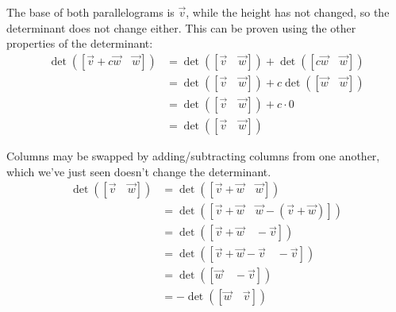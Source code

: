 \begin{applicationActivities}
\begin{observation}
\begin{center}
\end{center}

The base of both parallelograms is $\vec{v}$, while the height has not changed,
so the determinant does not change either. This can be proven using the
other properties of the determinant:
  \begin{align*}
  \det([\vec{v}+c\vec{w}\hspace{1em}\vec{w}])
&=
  \det([\vec{v}\hspace{1em}\vec{w}])+
  \det([c\vec{w}\hspace{1em}\vec{w}])
\\ &=
  \det([\vec{v}\hspace{1em}\vec{w}])+
  c\det([\vec{w}\hspace{1em}\vec{w}])
\\ &=
  \det([\vec{v}\hspace{1em}\vec{w}])+
  c\cdot 0
\\ &=
  \det([\vec{v}\hspace{1em}\vec{w}])
  \end{align*}
\end{observation}

\begin{observation}
Columns may be swapped by adding/subtracting columns from one another,
which we've just seen doesn't change the determinant.  
\begin{align*}
  \det([\vec{v}\hspace{1em}\vec{w}])
&=
  \det([\vec{v}+\vec{w}\hspace{1em}\vec{w}])
\\ &=
  \det([\vec{v}+\vec{w}\hspace{1em}\vec{w}-(\vec{v}+\vec{w})])
\\ &=
  \det([\vec{v}+\vec{w}\hspace{1em}-\vec{v}])
\\ &=
  \det([\vec{v}+\vec{w}-\vec{v}\hspace{1em}-\vec{v}])
\\ &=
  \det([\vec{w}\hspace{1em}-\vec{v}])
\\ &=
  -\det([\vec{w}\hspace{1em}\vec{v}])
  \end{align*}


\end{observation}
\end{applicationActivities}
